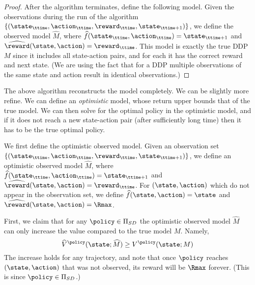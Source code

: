 \begin{proof}
After the algorithm terminates, define the following model. Given
the observations during the run of the algorithm
$\{(\state_\ttime,\action_\ttime ,\reward_\ttime,
\state_{\ttime+1})\}$, we define the observed model $\widehat{M}$,
where $\widehat{f}(\state_\ttime,\action_\ttime)=\state_{\ttime+1}$
and $\widehat{\reward}(\state,\action)=\reward_\ttime$. This model
is exactly the true DDP $M$ since it includes all state-action
pairs, and for each it has the correct reward and next state. (We
are using the fact that for a DDP multiple observations of the same
state and action result in identical observations.)
\end{proof}

The above algorithm reconstructs the model completely. We can be
slightly more refine. We can define an {\em optimistic} model, whose
return upper bounds that of the true model. We can then solve for
the optimal policy in the optimistic model, and if it does not reach a new state-action pair (after sufficiently long time) then it
has to be the true optimal policy.

We first define the optimistic observed model. Given an observation
set $\{(\state_\ttime,\action_\ttime ,\reward_\ttime,
\state_{\ttime+1})\}$, we define an optimistic observed model
$\widehat{M}$, where
$\widehat{f}(\state_\ttime,\action_\ttime)=\state_{\ttime+1}$ and
$\widehat{\reward}(\state,\action)=\reward_\ttime$.
%
For $(\state,\action)$ which do not appear in the observation set,
we define $\widehat{f}(\state,\action)=\state$ and
$\widehat{\reward}(\state,\action)=\Rmax$.

First, we claim that for any $\policy\in {\Pi _{SD}}$ the optimistic
observed model $\widehat{M}$ can only increase the value compared to
the true model $M$. Namely,
\[
\widehat{V}^\policy(\state;\widehat{M})\geq V^\policy(\state;M)
\]
The increase holds for any trajectory, and note that once $\policy$
reaches $(\state,\action)$ that was not observed, its reward will be
$\Rmax$ forever. (This is since $\policy\in {\Pi _{SD}}$.)


